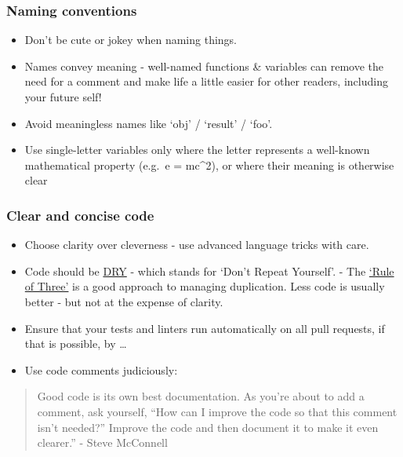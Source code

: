 \documentclass[]{book}
\providecommand{\tightlist}{%
  \setlength{\itemsep}{0pt}\setlength{\parskip}{0pt}}
\begin{document}
\hypertarget{names}{%
\subsubsection{Naming conventions}\label{names}}

\begin{itemize}
\tightlist
\item
  Don't be cute or jokey when naming things.
\item
  Names convey meaning - well-named functions \& variables can remove the need for a comment and make life a little easier for other readers, including your future self!
\item
  Avoid meaningless names like `obj' / `result' / `foo'.
\item
  Use single-letter variables only where the letter represents a well-known mathematical property (e.g.~e = mc\^{}2), or where their meaning is otherwise clear
\end{itemize}

\hypertarget{ccc}{%
\subsubsection{Clear and concise code}\label{ccc}}

\begin{itemize}
\tightlist
\item
  Choose clarity over cleverness - use advanced language tricks with care.
\item
  Code should be \href{https://en.wikipedia.org/wiki/Don\%27t_repeat_yourself}{DRY} - which stands for `Don't Repeat Yourself'. - The \href{https://en.wikipedia.org/wiki/Rule_of_three_(computer_programming)}{`Rule of Three'} is a good approach to managing duplication. Less code is usually better - but not at the expense of clarity.\\
\item
  Ensure that your tests and linters run automatically on all pull requests, if that is possible, by \ldots{}
\item
  Use code comments judiciously:
\end{itemize}

\begin{quote}
Good code is its own best documentation. As you're about to add a comment, ask yourself, ``How can I improve the code so that this comment isn't needed?'' Improve the code and then document it to make it even clearer.'' - Steve McConnell
\end{quote}
\end{document}
